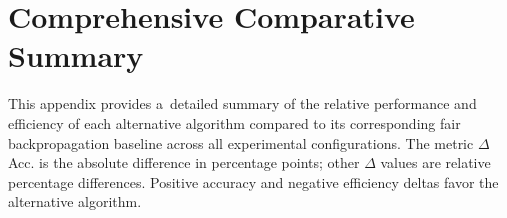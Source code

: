 \documentclass[letterpaper]{article}
\begin{document}


\appendix
\section{Comprehensive Comparative Summary}
\label{app:full_comparison}

This appendix provides a~detailed summary of the relative performance and efficiency of each alternative algorithm compared to its corresponding fair backpropagation baseline across all experimental configurations. The metric $\Delta$Acc. is the absolute difference in percentage points; other $\Delta$ values are relative percentage differences. Positive accuracy and negative efficiency deltas favor the alternative algorithm.

\begin{center}
    \label{tab:appendix_ff_comparison}
\end{center}
\end{document}
